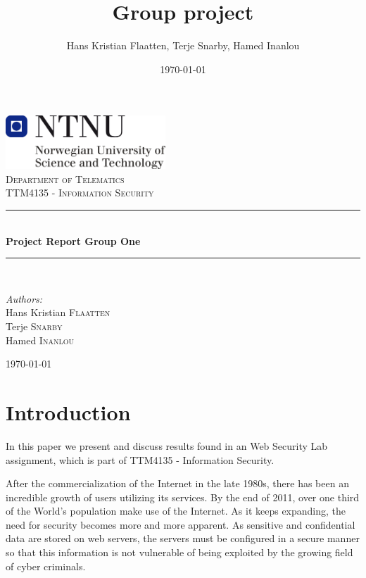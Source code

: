 \documentclass[a4paper, 12pt]{article}
\title{Group project}
\author{Hans Kristian Flaatten, Terje Snarby, Hamed Inanlou }
\date{\today}
\begin{document}
\begin{titlepage}
\begin{center}
\includegraphics[width=0.45\textwidth]{./img/NTNU-logo.png}\\[5cm]
\textsc{\large Department of Telematics}\\[0.2cm]
\textsc{\Large TTM4135 - Information Security}\\[0.5cm]

\rule{\linewidth}{0.2mm} \\[0.4cm]
{ \LARGE \bfseries Project Report Group One}\\[0.2cm]
\rule{\linewidth}{0.2mm} \\[1.5cm]

\begin{minipage}{0.4\textwidth}
\begin{flushleft} \large
\emph{Authors:}\\
Hans Kristian \textsc{Flaatten}\\
Terje \textsc{Snarby}\\
Hamed \textsc{Inanlou}
\end{flushleft}
\end{minipage}

\vfill
{\large \today}
\end{center}
\end{titlepage}


\section{Introduction}
In this paper we present and discuss results found in an Web Security Lab assignment, which is part of TTM4135 - Information Security. 

After the commercialization of the Internet in the late 1980s, there has been an incredible growth of users utilizing its services. By the end of 2011, over one third of the World’s population make use of the Internet\cite{net}. As it keeps expanding, the need for security becomes more and more apparent. As sensitive and confidential data are stored on web servers, the servers must be configured in a secure manner so that this information is not vulnerable of being exploited by the growing field of cyber criminals.
\end{document}
